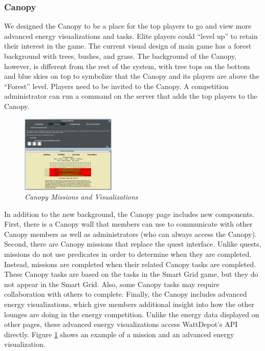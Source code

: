 \documentclass{acm_proc_article-sp}
\begin{document}
\subsubsection{Canopy}

We designed the Canopy to be a place for the top players to go and view
more advanced energy visualizations and tasks. Elite players could ``level
up'' to retain their interest in the game. The current visual design of
main game has a forest background with trees, bushes, and grass. The
background of the Canopy, however, is different from the rest of the
system, with tree tops on the bottom and blue skies on top to symbolize
that the Canopy and its players are above the ``Forest'' level. Players need to be invited
to the Canopy. A competition administrator can run a command on the server
that adds the top players to the Canopy.

\begin{figure}[ht!]
  \center
  \includegraphics[width=0.4\textwidth]{canopy-missions-visualizations.eps}
  \caption{\em \small Canopy Missions and Visualizations}
  \label{fig:CanopyMissions}
\end{figure}

In addition to the new background, the Canopy page includes new components. First, there is a Canopy wall that members can use to communicate with other Canopy members as well as administrators (who can always access the Canopy). Second, there are Canopy missions that replace the quest interface. Unlike quests, missions do not use predicates in order to determine when they are completed. Instead, missions are completed when their related Canopy tasks are completed. These Canopy tasks are based on the tasks in the Smart Grid game, but they do not appear in the Smart Grid. Also, some Canopy tasks may require collaboration with others to complete. Finally, the Canopy includes advanced energy visualizations, which give members additional insight into how the other lounges are doing in the energy competition. Unlike the energy data displayed on other pages, these advanced energy visualizations access WattDepot's API directly. Figure \ref{fig:CanopyMissions} shows an example of a mission and an advanced energy visualization.
\end{document}
